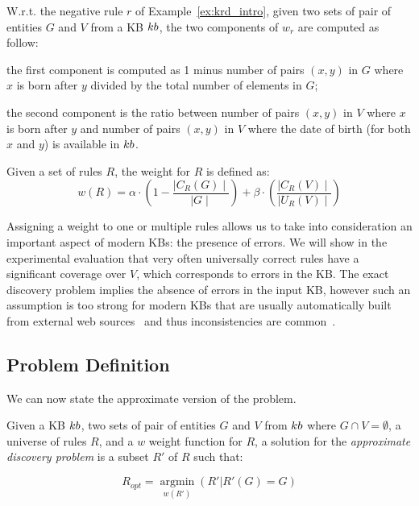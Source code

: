 \begin{example}
	W.r.t. the negative rule $r$ of Example~\ref{ex:krd_intro}, given two sets of pair of entities $G$ and $V$ from a KB ${\sc kb}$, the two components of $w_r$ are computed as follow:
	\begin{inparaenum}[\itshape1)]
		\item the first component is computed as 1 minus number of pairs $(x,y)$ in $G$ where
		$x$ is born after $y$ divided by the total number of elements in $G$;
		\item the second component is the ratio between number of pairs $(x,y)$ in $V$ where $x$ is born after $y$ and number of pairs $(x,y)$ in $V$ where the date of birth (for both $x$ and $y$) is available in ${\sc kb}$.
	\end{inparaenum}
\end{example}

\begin{definition}
	Given a set of rules $R$, the weight for $R$ is defined as:
	\begin{equation*}
	w(R) = \alpha \cdot (1-\frac{\mid C_{R}(G)\mid}{\mid G \mid}) +\beta \cdot (\frac{\mid C_{R}(V) \mid}{\mid U_{R}(V)\mid})
	\end{equation*}
\end{definition}

Assigning a weight to one or multiple rules allows us to take into consideration an important aspect of modern KBs: the presence of errors. We will show in the experimental evaluation that very often universally correct rules have a significant coverage over $V$, which corresponds to errors in the KB. The exact discovery problem implies the absence of errors in the input KB, however such an assumption is too strong for modern KBs that are usually automatically built from external web sources~\cite{dong2014knowledge,shin2015incremental,suchanek2007yago} and thus inconsistencies are common~\cite{suchanek2009sofie}.


\subsection{Problem Definition} \label{sec:krd_prob_def}
We can now state the approximate version of the problem.

\begin{definition}
	Given a KB ${\sc kb}$, two sets of pair of entities $G$ and $V$ from ${\sc kb}$ where $G \cap V = \emptyset$, a universe of rules $R$, and a $w$ weight function for $R$,
	a solution for the \emph{approximate discovery problem} is a subset $R'$ of $R$  such that:
	
	$$R_{opt}=\underset{w(R')}{\operatorname{argmin}}(R'|R'(G) = G)$$
\end{definition}


